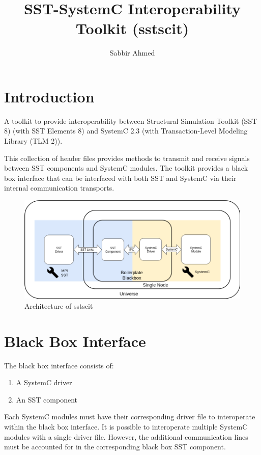 \documentclass{article}
\title{SST-SystemC Interoperability Toolkit (sstscit)}
\author{
    Sabbir Ahmed
}
\begin{document}
    \maketitle
    
    \begin{abstract}
    \lipsum[1]
    \end{abstract}
    
    \section{Introduction}
    A toolkit to provide interoperability between Structural Simulation Toolkit (SST 8) (with SST Elements 8) and SystemC 2.3 (with Transaction-Level Modeling Library (TLM 2)).
    
    This collection of header files provides methods to transmit and receive signals between SST components and SystemC modules. The toolkit provides a black box interface that can be interfaced with both SST and SystemC via their internal communication transports. 
    
    \begin{figure}[!h]
      \centering
      \includegraphics[width=5.5in]{comm.png}
      \caption{Architecture of sstscit}
      \label{fig:fig1}
    \end{figure}
    
    \section{Black Box Interface} \label{sec:headings}
    The black box interface consists of:
    \begin{enumerate}
        \item A SystemC driver
        \item An SST component
    \end{enumerate}
    
    Each SystemC modules must have their corresponding driver file to interoperate within the black box interface. It is possible to interoperate multiple SystemC modules with a single driver file. However, the additional communication lines must be accounted for in the corresponding black box SST component.
    
\end{document}

